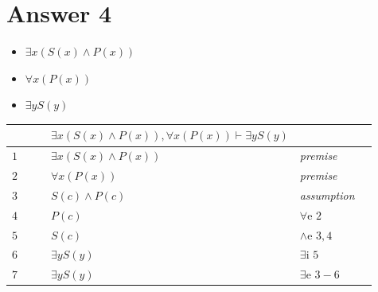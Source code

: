 \documentclass[12pt]{article}
\begin{document}
\section*{Answer 4}

\begin{itemize}
\centering
    \item $\exists x(S(x) \wedge P(x))$
    \item $\forall x(P(x)) $
    \item $\exists yS(y)$
\end{itemize}

\begin{table}[H]
	\centering

	\begin{tabular}{*6{l}}
        $ $ & & & $ \exists x(S(x) \wedge P(x)),\forall x(P(x)) \vdash \exists yS(y)   $ & &\\
        \hline
        \hline

		$1$ & & & $ \exists x(S(x) \wedge P(x))$ &\textit{premise} &\\

		$2$ & & & $ \forall x(P(x)) $ &\textit{premise} &\\ \cline{2-6}

		$3$ &\multicolumn{1}{|c}{}& & $ S(c) \wedge P(c)$ & {\textit{assumption}} & \multicolumn{1}{c|}{}\\

		$4$ &\multicolumn{1}{|c}{} & & $P(c)$ & $\forall$e $2$ & \multicolumn{1}{c|}{}\\

		$5$ &\multicolumn{1}{|c}{} & & $S(c) $ & $\wedge$e $3,4$ & \multicolumn{1}{c|}{}\\

		$6$ &\multicolumn{1}{|c}{}& & $ \exists yS(y)$ & {$\exists$i $5$}&\multicolumn{1}{c|}{}\\\cline{2-6}

		$7$ & & & $\exists yS(y)$ & {$\exists$e $3-6$}& \\


	\end{tabular}
\end{table}
\end{document}
